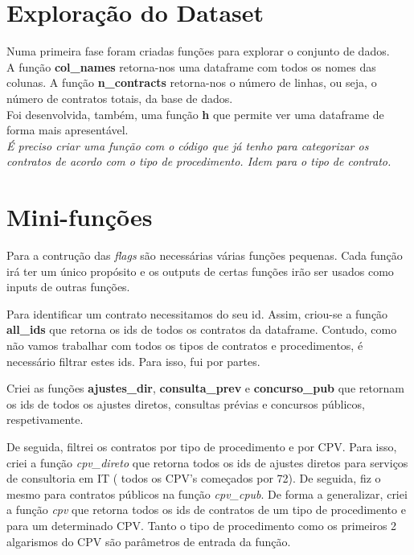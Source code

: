 \section{Exploração do Dataset}

Numa primeira fase foram criadas funções para explorar o conjunto de dados. \\

A função \textbf{col\_names} retorna-nos uma dataframe com todos os nomes das colunas. A função \textbf{n\_contracts} retorna-nos o número de linhas, ou seja, o número de contratos totais, da base de dados. \\

Foi desenvolvida, também, uma função \textbf{h} que permite ver uma dataframe de forma mais apresentável.\\

\textit{É preciso criar uma função com o código que já tenho para categorizar os contratos de acordo com o tipo de procedimento. Idem para o tipo de contrato.} \\

 






\section{Mini-funções}

Para a contrução das \textit{flags} são necessárias várias funções pequenas. Cada função irá ter um único propósito e os outputs de certas funções irão ser usados como inputs de outras funções. 

Para identificar um contrato necessitamos do seu id. Assim, criou-se a função \textbf{all\_ids} que retorna os ids de todos os contratos da dataframe. Contudo, como não vamos trabalhar com todos os tipos de contratos e procedimentos, é necessário filtrar estes ids. Para isso, fui por partes.

Criei as funções \textbf{ajustes\_dir}, \textbf{consulta\_prev} e \textbf{concurso\_pub} que retornam os ids de todos os ajustes diretos, consultas prévias e concursos públicos, respetivamente. 

De seguida, filtrei os contratos por tipo de procedimento e por CPV. Para isso, criei a função \textit{cpv\_direto} que retorna todos os ids de ajustes diretos para serviços de consultoria em IT ( todos os CPV's começados por 72). De seguida, fiz o mesmo para contratos públicos na função \textit{cpv\_cpub}. De forma a generalizar, criei a função \textit{cpv} que retorna todos os ids de contratos de um tipo de procedimento e para um determinado CPV. Tanto o tipo de procedimento como os primeiros 2 algarismos do CPV são parâmetros de entrada da função. 


